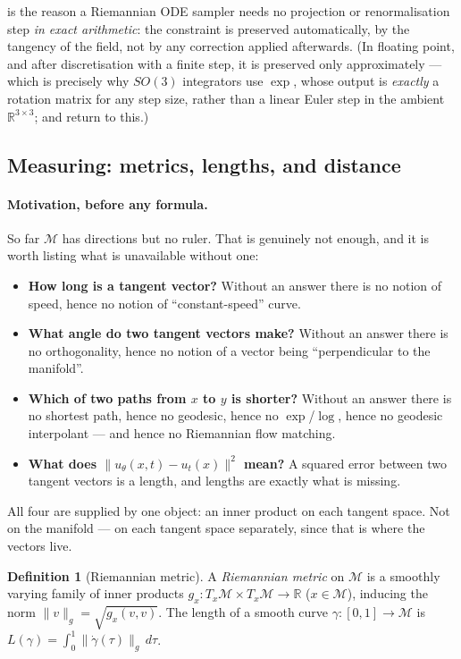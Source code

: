 \documentclass[11pt,a4paper]{report}
\theoremstyle{definition}
\newtheorem{definition}[definition]{Definition}
\theoremstyle{remark}
\newcommand{\RR}{\mathbb R}
\begin{document}
 is the reason a Riemannian ODE sampler
needs no projection or renormalisation step \emph{in exact arithmetic}: the
constraint is preserved automatically, by the tangency of the field, not by
any correction applied afterwards. (In floating point, and after
discretisation with a finite step, it is preserved only approximately ---
which is precisely why $SO(3)$ integrators use $\exp$, whose output is
\emph{exactly} a rotation matrix for any step size, rather than a linear
Euler step in the ambient $\RR^{3\times3}$;
 and  return to this.)

\subsection{Measuring: metrics, lengths, and distance}
\label{sec:metric-scratch-sec}

\paragraph{Motivation, before any formula.} So far $\mathcal M$ has
directions but no ruler. That is genuinely not enough, and it is worth
listing what is unavailable without one:

\begin{itemize}
\item \textbf{How long is a tangent vector?} Without an answer there is no
      notion of speed, hence no notion of ``constant-speed'' curve.
\item \textbf{What angle do two tangent vectors make?} Without an answer
      there is no orthogonality, hence no notion of a vector being
      ``perpendicular to the manifold''.
\item \textbf{Which of two paths from $x$ to $y$ is shorter?} Without an
      answer there is no shortest path, hence no geodesic, hence no
      $\exp$/$\log$, hence no geodesic interpolant --- and hence no
      Riemannian flow matching.
\item \textbf{What does $\|u_\theta(x,t)-u_t(x)\|^2$ mean?} A squared error
      between two tangent vectors is a length, and lengths are exactly what
      is missing.
\end{itemize}

All four are supplied by one object: an inner product on each tangent
space. Not on the manifold --- on each tangent space separately, since that
is where the vectors live.

\begin{definition}[Riemannian metric]
\label{def:metric-scratch}
A \emph{Riemannian metric} on $\mathcal M$ is a smoothly varying family of
inner products $g_x:T_x\mathcal M\times T_x\mathcal M\to\RR$
($x\in\mathcal M$), inducing the norm $\|v\|_g=\sqrt{g_x(v,v)}$. The length
of a smooth curve $\gamma:[0,1]\to\mathcal M$ is
$L(\gamma)=\int_0^1\|\dot\gamma(\tau)\|_{g}\,d\tau$.
\end{definition}
\end{document}
